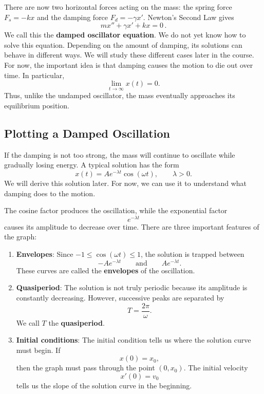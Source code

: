 \documentclass[11pt,letterpaper]{article}
\begin{document}
There are now two horizontal forces acting on the mass: the spring force $F_s=-kx$ and the damping force $F_d=-\gamma x'$. Newton's Second Law gives
\[
m x'' + \gamma x' + kx = 0\,.
\]
We call this the \textbf{damped oscillator equation}.
We do not yet know how to solve this equation. Depending on the amount of damping, its solutions can behave in different ways. We will study these different cases later in the course. For now, the important idea is that damping causes the motion to die out over time. In particular,
\[
\lim_{t\to\infty}x(t)=0.
\]
Thus, unlike the undamped oscillator, the mass eventually approaches its equilibrium position.

\subsection{Plotting a Damped Oscillation}
If the damping is not too strong, the mass will continue to oscillate while gradually losing energy. A typical solution has the form
\[
x(t)=Ae^{-\lambda t}\cos(\omega t),
\qquad \lambda>0.
\]
We will derive this solution later. For now, we can use it to understand what damping does to the motion.

The cosine factor produces the oscillation, while the exponential factor
\[
e^{-\lambda t}
\]
causes its amplitude to decrease over time. There are three important features of the graph:
\begin{enumerate}
    \item \textbf{Envelopes}: Since $-1\leq \cos(\omega t)\leq 1$, the solution is trapped between
    \[
    -Ae^{-\lambda t}
    \qquad\text{and}\qquad
    Ae^{-\lambda t}.
    \]
    These curves are called the \textbf{envelopes} of the oscillation.

    \item \textbf{Quasiperiod}: The solution is not truly periodic because its amplitude is constantly decreasing. However, successive peaks are separated by
    \[
    T=\frac{2\pi}{\omega}.
    \]
    We call $T$ the \textbf{quasiperiod}.

    \item \textbf{Initial conditions}: The initial condition tells us where the solution curve must begin. If
    \[
    x(0)=x_0,
    \]
    then the graph must pass through the point $(0,x_0)$. The initial velocity
    $$
    x'(0)=v_0
    $$
    tells us the slope of the solution curve in the beginning.
\end{enumerate}
\end{document}
